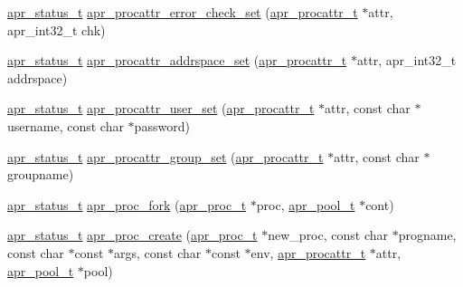 \begin{DoxyCompactItemize}
\item 
\hyperlink{group__apr__errno_gaf76ee4543247e9fb3f3546203e590a6c}{apr\+\_\+status\+\_\+t} \hyperlink{group__apr__thread__proc_ga24076f050e9385af09ad8c3931d8dc43}{apr\+\_\+procattr\+\_\+error\+\_\+check\+\_\+set} (\hyperlink{group__apr__thread__proc_ga0d83919a6a0dd609598a864917f8b339}{apr\+\_\+procattr\+\_\+t} $\ast$attr, apr\+\_\+int32\+\_\+t chk)
\item 
\hyperlink{group__apr__errno_gaf76ee4543247e9fb3f3546203e590a6c}{apr\+\_\+status\+\_\+t} \hyperlink{group__apr__thread__proc_ga0f1dd02408995767efcb9c0d9c775620}{apr\+\_\+procattr\+\_\+addrspace\+\_\+set} (\hyperlink{group__apr__thread__proc_ga0d83919a6a0dd609598a864917f8b339}{apr\+\_\+procattr\+\_\+t} $\ast$attr, apr\+\_\+int32\+\_\+t addrspace)
\item 
\hyperlink{group__apr__errno_gaf76ee4543247e9fb3f3546203e590a6c}{apr\+\_\+status\+\_\+t} \hyperlink{group__apr__thread__proc_ga741ed3dc047b935b091a21528c49bb19}{apr\+\_\+procattr\+\_\+user\+\_\+set} (\hyperlink{group__apr__thread__proc_ga0d83919a6a0dd609598a864917f8b339}{apr\+\_\+procattr\+\_\+t} $\ast$attr, const char $\ast$username, const char $\ast$password)
\item 
\hyperlink{group__apr__errno_gaf76ee4543247e9fb3f3546203e590a6c}{apr\+\_\+status\+\_\+t} \hyperlink{group__apr__thread__proc_ga391f0d3831a5894ea2118762789a395d}{apr\+\_\+procattr\+\_\+group\+\_\+set} (\hyperlink{group__apr__thread__proc_ga0d83919a6a0dd609598a864917f8b339}{apr\+\_\+procattr\+\_\+t} $\ast$attr, const char $\ast$groupname)
\item 
\hyperlink{group__apr__errno_gaf76ee4543247e9fb3f3546203e590a6c}{apr\+\_\+status\+\_\+t} \hyperlink{group__apr__thread__proc_ga3d0415bf69b0a629a929833e82758b85}{apr\+\_\+proc\+\_\+fork} (\hyperlink{structapr__proc__t}{apr\+\_\+proc\+\_\+t} $\ast$proc, \hyperlink{group__apr__pools_gaf137f28edcf9a086cd6bc36c20d7cdfb}{apr\+\_\+pool\+\_\+t} $\ast$cont)
\item 
\hyperlink{group__apr__errno_gaf76ee4543247e9fb3f3546203e590a6c}{apr\+\_\+status\+\_\+t} \hyperlink{group__apr__thread__proc_gab51dd90b98d365a969f0ec5c7bef4e14}{apr\+\_\+proc\+\_\+create} (\hyperlink{structapr__proc__t}{apr\+\_\+proc\+\_\+t} $\ast$new\+\_\+proc, const char $\ast$progname, const char $\ast$const $\ast$args, const char $\ast$const $\ast$env, \hyperlink{group__apr__thread__proc_ga0d83919a6a0dd609598a864917f8b339}{apr\+\_\+procattr\+\_\+t} $\ast$attr, \hyperlink{group__apr__pools_gaf137f28edcf9a086cd6bc36c20d7cdfb}{apr\+\_\+pool\+\_\+t} $\ast$pool)

\end{DoxyCompactItemize}
